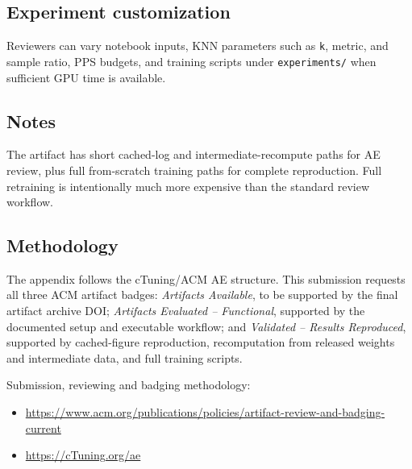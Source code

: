 \documentclass{sigplanconf}
\begin{document}
\subsection{Experiment customization}
Reviewers can vary notebook inputs, KNN parameters such as \texttt{k}, metric, and sample ratio, PPS budgets, and training scripts under \texttt{experiments/} when sufficient GPU time is available.

\subsection{Notes}
The artifact has short cached-log and intermediate-recompute paths for AE review, plus full from-scratch training paths for complete reproduction. Full retraining is intentionally much more expensive than the standard review workflow.

\subsection{Methodology}
The appendix follows the cTuning/ACM AE structure.  This submission requests all three ACM artifact badges: \emph{Artifacts Available}, to be supported by the final artifact archive DOI; \emph{Artifacts Evaluated -- Functional}, supported by the documented setup and executable workflow; and \emph{Validated -- Results Reproduced}, supported by cached-figure reproduction, recomputation from released weights and intermediate data, and full training scripts.


Submission, reviewing and badging methodology:
\begin{itemize}
\item \url{https://www.acm.org/publications/policies/artifact-review-and-badging-current}
\item \url{https://cTuning.org/ae}
\end{itemize}
\end{document}

